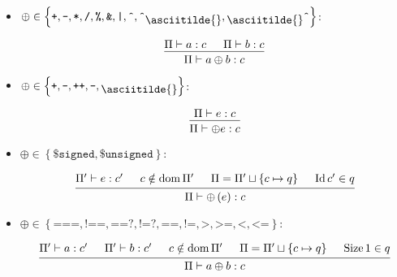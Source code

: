 \documentclass{article}
\DeclareMathOperator{\dom}{dom}
\DeclareMathOperator{\Size}{Size}
\DeclareMathOperator{\Id}{Id}
\newcommand{\mytilde}{\raisebox{-.7ex}{\asciitilde{}}}
\newcommand{\binOp}{\ensuremath{\left\{
      \texttt{+}, \texttt{-}, \texttt{*}, \texttt{/}, \texttt{\%}, \texttt{\&},
      \texttt{|}, \texttt{\^{}}, \texttt{\^{}}\mytilde, \mytilde\texttt{\^{}}
      \right\}}}
\newcommand{\unOp}{\ensuremath{\left\{
      \texttt{+}, \texttt{-}, \texttt{++}, \texttt{--}, \mytilde
    \right\}}}
\newcommand{\cast}{\ensuremath{\left\{\texttt{\$signed}, \texttt{\$unsigned}\right\}}}
\newcommand{\comp}{\ensuremath{\left\{
      \texttt{===}, \texttt{!==}, \texttt{==?}, \texttt{!=?}, \texttt{==},
      \texttt{!=}, \texttt{>}, \texttt{>=}, \texttt{<}, \texttt{<=}
    \right\}}}
\begin{document}
\begin{itemize}[leftmargin=*]
    \setlength{\itemsep}{2em}

    \item $\oplus \in \binOp$:

          \begin{equation*}
              \begin{prooftree}
                  \hypo{\Pi \vdash a: c}
                  \hypo{\Pi \vdash b: c}
                  \infer2{\Pi \vdash a \oplus b: c}
              \end{prooftree}
          \end{equation*}

    \item $\oplus \in \unOp$:

          \begin{equation*}
              \begin{prooftree}
                  \hypo{\Pi \vdash e: c}
                  \infer1{\Pi \vdash \oplus e: c}
              \end{prooftree}
          \end{equation*}

    \item $\oplus \in \cast$:

          \begin{equation*}
              \begin{prooftree}
                  \hypo{\Pi' \vdash e: c'}
                  \hypo{c \notin \dom \Pi'}
                  \hypo{\Pi = \Pi' \sqcup \left\{c \mapsto q\right\}}
                  \hypo{\Id c' \in q}
                  \infer4{\Pi \vdash \oplus \left(e\right): c}
              \end{prooftree}
          \end{equation*}

    \item $\oplus \in \comp$:

          \begin{equation*}
              \begin{prooftree}
                  \hypo{\Pi' \vdash a: c'}
                  \hypo{\Pi' \vdash b: c'}
                  \hypo{c \notin \dom \Pi'}
                  \hypo{\Pi = \Pi' \sqcup \left\{c \mapsto q\right\}}
                  \hypo{\Size 1 \in q}
                  \infer5{\Pi \vdash a \oplus b: c}
              \end{prooftree}
          \end{equation*}


\end{itemize}
\end{document}
